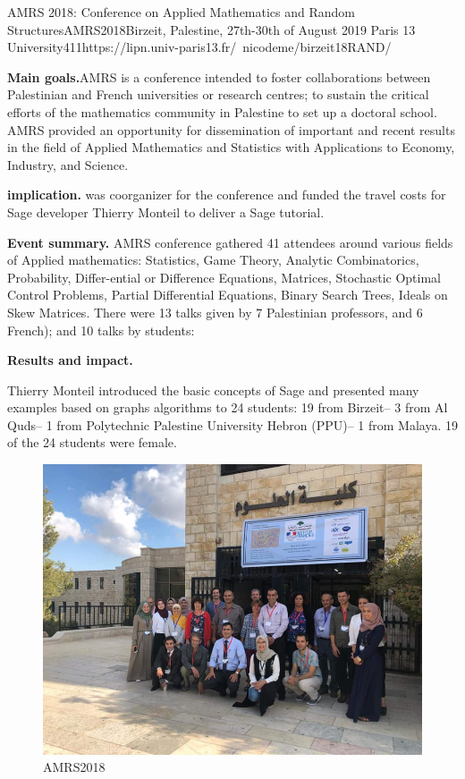 \begin{event}{AMRS 2018: Conference on Applied Mathematics and Random Structures}{AMRS2018}{Birzeit, Palestine, 27th-30th of August 2019}
{Paris 13 University}{41}{1}{https://lipn.univ-paris13.fr/~nicodeme/birzeit18RAND/}

\textbf{Main goals.}AMRS is a conference intended to foster collaborations between Palestinian and French universities or research centres; 
to sustain the critical efforts of the mathematics community in Palestine to set up a doctoral school. AMRS provided an opportunity for dissemination of important and recent results in the field of Applied Mathematics and Statistics with Applications to Economy, Industry, and Science.

\textbf{\ODK implication.}
\ODK was coorganizer for the conference and funded the travel costs
for Sage developer Thierry Monteil to deliver a Sage tutorial.

\textbf{Event summary.}
AMRS conference gathered 41 attendees around various fields of Applied mathematics: Statistics, Game Theory, Analytic Combinatorics, 
Probability, Differ-ential or Difference Equations, Matrices,
Stochastic Optimal Control Problems, Partial Differential Equations, 
Binary Search Trees, Ideals on Skew Matrices. 
There were 13 talks given by 7 Palestinian professors, and 6 French); and 10 talks by students:

\textbf{Results and impact.}

Thierry Monteil introduced the basic concepts of Sage and presented
many examples based on graphs algorithms to 24 students: 19 from
Birzeit– 3 from Al Quds– 1 from Polytechnic Palestine University
Hebron (PPU)– 1 from Malaya. 19 of the 24 students were female.


\begin{figure}[ht]
  \includegraphics[width=.75\textwidth]{AMRS.png}
  \caption*{AMRS2018}
\end{figure}

\end{event}
